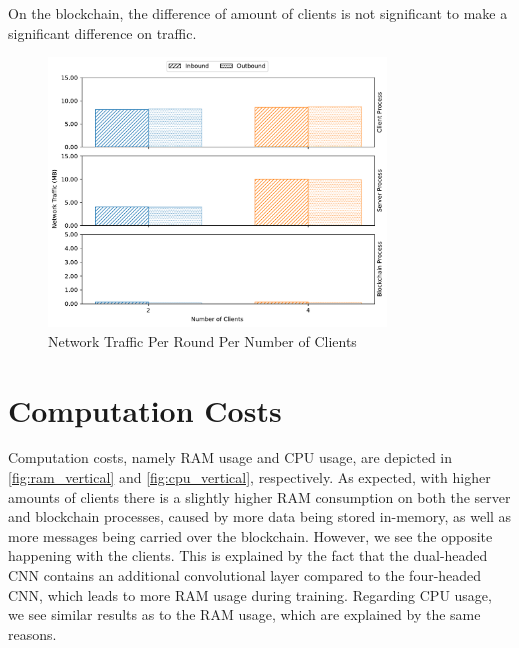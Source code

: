 On the blockchain, the difference of amount of clients is not significant to make a significant difference on traffic.

\begin{figure}[!ht]
    \centering
    \centering
    \includegraphics[width=0.8\textwidth]{graphics/vertical/net.pdf}
    \caption{Network Traffic Per Round Per Number of Clients}
    \label{fig:net_vertical}
\end{figure}

\section{Computation Costs}

Computation costs, namely RAM usage and CPU usage, are depicted in \autoref{fig:ram_vertical} and \autoref{fig:cpu_vertical}, respectively. As expected, with higher amounts of clients there is a slightly higher RAM consumption on both the server and blockchain processes, caused by more data being stored in-memory, as well as more messages being carried over the blockchain. However, we see the opposite happening with the clients. This is explained by the fact that the dual-headed CNN contains an additional convolutional layer compared to the four-headed CNN, which leads to more RAM usage during training. Regarding CPU usage, we see similar results as to the RAM usage, which are explained by the same reasons.


